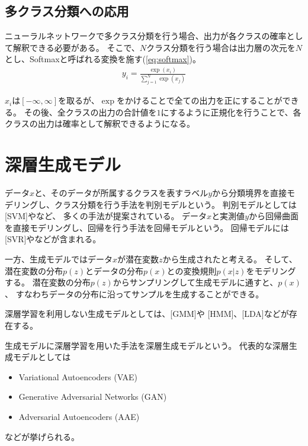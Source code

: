 \subsection{多クラス分類への応用}

ニューラルネットワークで多クラス分類を行う場合、出力が各クラスの確率として解釈できる必要がある。
そこで、$N$クラス分類を行う場合は出力層の次元を$N$とし、Softmaxと呼ばれる変換を施す(\eqref{eq:softmax})。
\begin{align}
    y_i = \frac{\exp(x_i)}{\sum_{j=1}^N \exp(x_j)} \label{eq:softmax}
\end{align}

$x_i$は$[-\infty, \infty]$を取るが、$\exp$をかけることで全ての出力を正にすることができる。
その後、全クラスの出力の合計値を$1$にするように正規化を行うことで、各クラスの出力は確率として解釈できるようになる。

\section{深層生成モデル}

データ$x$と、そのデータが所属するクラスを表すラベル$y$から分類境界を直接モデリングし、クラス分類を行う手法を判別モデルという。
判別モデルとしては[SVM]やなど、
多くの手法が提案されている。
データ$x$と実測値$y$から回帰曲面を直接モデリングし、回帰を行う手法を回帰モデルという。
回帰モデルには[SVR]やなどが含まれる。

一方、生成モデルではデータ$x$が潜在変数$z$から生成されたと考える。
そして、潜在変数の分布$p(z)$とデータの分布$p(x)$との変換規則$p(x|z)$をモデリングする。
潜在変数の分布$p(z)$からサンプリングして生成モデルに通すと、$p(x)$、
すなわちデータの分布に沿ってサンプルを生成することができる。

深層学習を利用しない生成モデルとしては、[GMM]や
[HMM]、[LDA]などが存在する。

生成モデルに深層学習を用いた手法を深層生成モデルという。
代表的な深層生成モデルとしては
\begin{itemize}
    \item Variational Autoencoders (VAE)
    \item Generative Adversarial Networks (GAN)
    \item Adversarial Autoencoders (AAE)
\end{itemize}
などが挙げられる。

